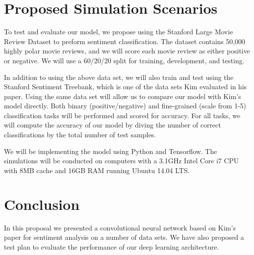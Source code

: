 \documentclass[conference]{IEEEtran}
\begin{document}
\section{Proposed Simulation Scenarios}
      To test and evaluate our model, we propose using the Stanford Large Movie Review 
      Dataset to preform sentiment classification\cite{maas-EtAl:2011:ACL-HLT2011}. 
      The dataset contains 50,000 highly polar
      movie reviews, and we will score each movie review as either positive or 
      negative. We will use a 60/20/20 split for training, development, and testing.
      
      In addition to using the above data set, we will also train and test using the Stanford Sentiment 
      Treebank, which is one of the data sets Kim evaluated in his paper\cite{sentimenttreebank}.
      Using the same data set
      will allow us to compare our model with Kim's model directly. Both binary (positive/negative)
      and fine-grained (scale from 1-5) classification tasks will be performed and scored for accuracy.
      For all tasks, we will compute the accuracy of our model by diving the number of correct classifications
      by the total number of test samples.
      
      We will be implementing the model using Python and Tensorflow. The simulations will be conducted on 
      computers with a 3.1GHz Intel Core i7 CPU with 8MB cache and 16GB RAM running Ubuntu 14.04 LTS.
      
\section{Conclusion}
In this proposal we presented a convolutional neural network based on Kim's paper for sentiment 
analysis on a number of data sets. We have also proposed a test plan to evaluate the performance of our 
deep learning architecture. 



\end{document}
